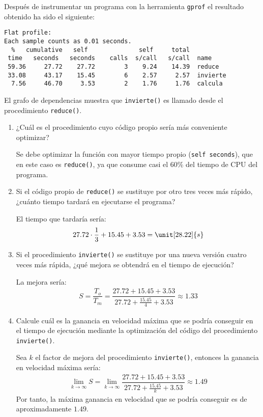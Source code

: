 \begin{ejercicio}
    Después de instrumentar un programa con la herramienta \verb|gprof| el resultado obtenido ha sido el siguiente:
    \begin{verbatim}
Flat profile:
Each sample counts as 0.01 seconds.
  %   cumulative   self              self     total           
 time   seconds   seconds    calls  s/call   s/call  name    
 59.36     27.72    27.72        3    9.24    14.39  reduce  
 33.08     43.17    15.45        6    2.57     2.57  invierte
  7.56     46.70     3.53        2    1.76     1.76  calcula
    \end{verbatim}

    El grafo de dependencias muestra que \verb|invierte()| es llamado desde el procedimiento \verb|reduce()|.
    \begin{enumerate}
        \item ¿Cuál es el procedimiento cuyo código propio sería más conveniente optimizar?
        
        Se debe optimizar la función con mayor tiempo propio (\verb|self seconds|), que en este caso es \verb|reduce()|, ya que consume casi el 60\% del tiempo de CPU del programa.
        \item Si el código propio de \verb|reduce()| se sustituye por otro tres veces más rápido, ¿cuánto tiempo tardará en ejecutarse el programa?
        
        El tiempo que tardaría sería:
        \begin{align*}
            27.72 \cdot \frac{1}{3} + 15.45 + 3.53 = \unit[28.22]{s}
        \end{align*}
        \item Si el procedimiento \verb|invierte()| se sustituye por una nueva versión cuatro veces más rápida, ¿qué mejora se obtendrá en el tiempo de ejecución?
        
        La mejora sería:
        \begin{align*}
            S = \dfrac{T_o}{T_m} = \dfrac{27.72 + 15.45 + 3.53}{27.72 + \frac{15.45}{4} + 3.53}\approx 1.33
        \end{align*}
        \item Calcule cuál es la ganancia en velocidad máxima que se podría conseguir en el tiempo de ejecución mediante la optimización del código del procedimiento \verb|invierte()|.
        
        Sea $k$ el factor de mejora del procedimiento \verb|invierte()|, entonces la ganancia en velocidad máxima sería:
        \begin{align*}
            \lim_{k\to\infty} S = \lim_{k\to\infty} \dfrac{27.72 + 15.45 + 3.53}{27.72 + \frac{15.45}{k} + 3.53} \approx 1.49
        \end{align*}
        Por tanto, la máxima ganancia en velocidad que se podría conseguir es de aproximadamente $1.49$.
    \end{enumerate}
\end{ejercicio}
